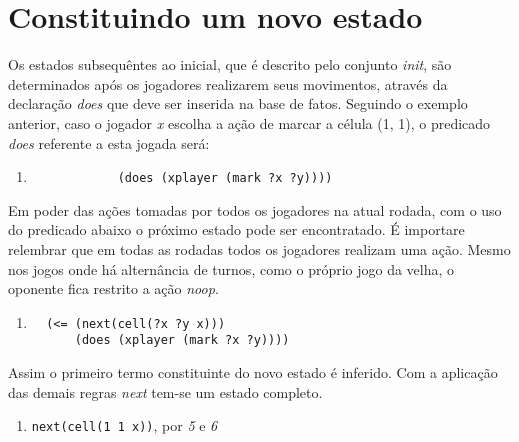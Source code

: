  
 \section{Constituindo um novo estado}
 Os estados subsequêntes ao inicial, que é descrito pelo conjunto \textit{init}, são determinados após os jogadores realizarem seus movimentos, através da declaração \textit{does} que deve ser inserida na base de fatos. Seguindo o exemplo anterior, caso o jogador \textit{x} escolha a ação de marcar a célula (1, 1), o predicado \textit{does} referente a esta jogada será:
\begin{enumerate}
  	\singlespacing
  	\setcounter{enumi}{4}
	\item 
		\begin{verbatim}
			(does (xplayer (mark ?x ?y))))
		\end{verbatim}		
\end{enumerate}
 \doublespacing

Em poder das ações tomadas por todos os jogadores na atual rodada, com o uso do predicado abaixo o próximo estado pode ser encontratado. É importare relembrar que em todas as rodadas todos os jogadores realizam uma ação. Mesmo nos jogos onde há alternância de turnos, como o próprio jogo da velha, o oponente fica restrito a ação \textit{noop}.
\begin{enumerate}
  	\singlespacing
  	\setcounter{enumi}{5}
   	\item 
   		\begin{verbatim}
  (<= (next(cell(?x ?y x)))
      (does (xplayer (mark ?x ?y))))               
 		\end{verbatim}
\end{enumerate}
\doublespacing
Assim o primeiro termo constituinte do novo estado é inferido. Com a aplicação das demais regras \textit{next} tem-se um estado completo. 
\begin{enumerate}
  	\singlespacing
  	\setcounter{enumi}{6}
	\item 
		\verb|next(cell(1 1 x))|, por {\it 5} e {\it 6}
\end{enumerate}
\doublespacing